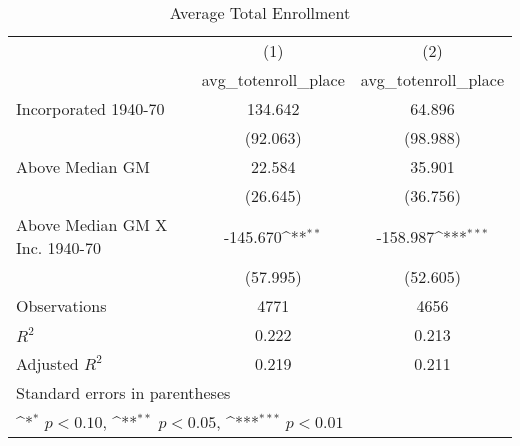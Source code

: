 \begin{table}[htbp]\centering
\def\sym#1{\ifmmode^{#1}\else\(^{#1}\)\fi}
\caption{Average Total Enrollment}
\begin{tabular}{l*{2}{c}}
\hline\hline
                    &\multicolumn{1}{c}{(1)}&\multicolumn{1}{c}{(2)}\\
                    &\multicolumn{1}{c}{avg\_totenroll\_place}&\multicolumn{1}{c}{avg\_totenroll\_place}\\
\hline
Incorporated 1940-70&     134.642         &      64.896         \\
                    &    (92.063)         &    (98.988)         \\
[1em]
Above Median GM     &      22.584         &      35.901         \\
                    &    (26.645)         &    (36.756)         \\
[1em]
Above Median GM X Inc. 1940-70&    -145.670\sym{**} &    -158.987\sym{***}\\
                    &    (57.995)         &    (52.605)         \\
\hline
Observations        &        4771         &        4656         \\
\(R^{2}\)           &       0.222         &       0.213         \\
Adjusted \(R^{2}\)  &       0.219         &       0.211         \\
\hline\hline
\multicolumn{3}{l}{\footnotesize Standard errors in parentheses}\\
\multicolumn{3}{l}{\footnotesize \sym{*} \(p<0.10\), \sym{**} \(p<0.05\), \sym{***} \(p<0.01\)}\\
\end{tabular}
\end{table}
